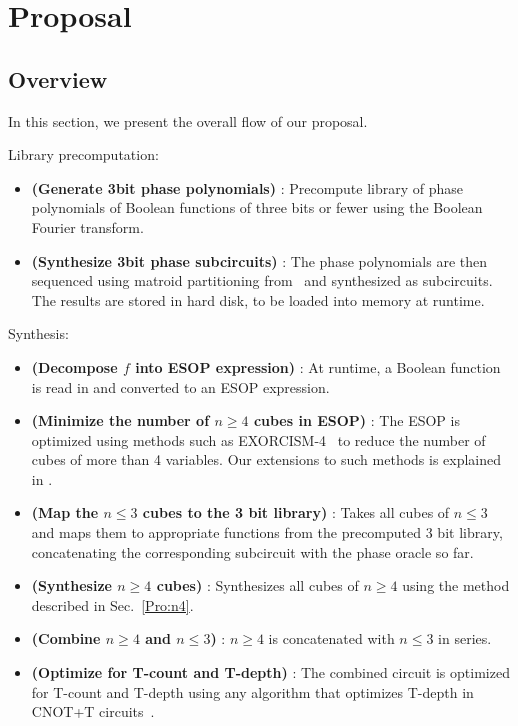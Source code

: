
\section{Proposal}
\label{Pro}
\subsection{Overview}

In this section, we present the overall flow of our proposal.

Library precomputation:
\begin{itemize}
\item \textbf{(Generate 3bit phase polynomials)} : Precompute library of phase polynomials
  of Boolean functions of three bits or fewer using the Boolean Fourier transform.
\item \textbf{(Synthesize 3bit phase subcircuits)} : The phase polynomials are then
  sequenced using matroid partitioning from~\cite{bib-amy-matroid} and synthesized as
  subcircuits. The results are stored in hard disk, to be loaded into memory at runtime.
\end{itemize}

Synthesis:
\begin{itemize}
\item \textbf{(Decompose $f$ into ESOP expression)} : At runtime, a Boolean function is
  read in and converted to an ESOP expression.
\item \textbf{(Minimize the number of $n \geq 4$ cubes in ESOP)} : The ESOP is optimized
  using methods such as EXORCISM-4~\cite{bib-exorcism} to reduce the number of cubes of
  more than 4 variables. Our extensions to such methods is explained in
  .
\item \textbf{(Map the $n \leq 3$ cubes to the 3 bit library)} : Takes all cubes of
  $n \leq 3$ and maps them to appropriate functions from the precomputed 3 bit library, concatenating the
  corresponding subcircuit with the phase oracle so far.
\item \textbf{(Synthesize $n \geq 4$ cubes)} : Synthesizes all cubes of $n \geq 4$ using the
  method described in Sec.~\ref{Pro:n4}.
\item \textbf{(Combine $n \geq 4$ and $n \leq 3$)} : $n \geq 4$ is concatenated with
  $n \leq 3$ in series.
\item \textbf{(Optimize for T-count and T-depth)} : The combined circuit is optimized for T-count and T-depth using
  any algorithm that optimizes T-depth in CNOT+T circuits~\cite{bib-amy-matroid}. 
\end{itemize}

